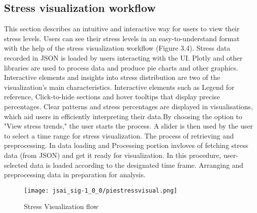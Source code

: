 \documentclass[a4j, twocolumn]{article}
\begin{document}
\subsection{Stress visualization workflow}
This section describes an intuitive and interactive way for users to view their stress levels. Users can see their stress levels in an easy-to-understand format with the help of the stress visualization workflow (Figure 3.4). Stress data recorded in JSON is loaded by users interacting with the UI. Plotly and other libraries are used to process data and produce pie charts and other graphics. Interactive elements and insights into stress distribution are two of the visualization's main characteristics. Interactive elements such as Legend for reference, Click-to-hide sections and hover tooltips that display precise percentages. Clear patterns and stress percentages are displayed in visualisations, which aid users in efficiently interpreting their data.By choosing the option to "View stress trends," the user starts the process. A slider is then used by the user to select a time range for stress visualization. The process of retrieving and preprocessing. In data loading and Processing portion invloves of fetching stress data (from JSON) and get it ready for visualization. In this procedure, user-selected data is loaded according to the designated time frame. Arranging and preprocessing data in preparation for analysis.
\vspace{10pt} %
\begin{figure}[h]
    \centering
 \texttt{[image: jsai\_sig-1\_0\_0/piestressvisual.png]}
    \caption{Stress Visualization flow}
    \label{fig:system_architecture}
\end{figure}
\vspace{10pt} %
\end{document}
